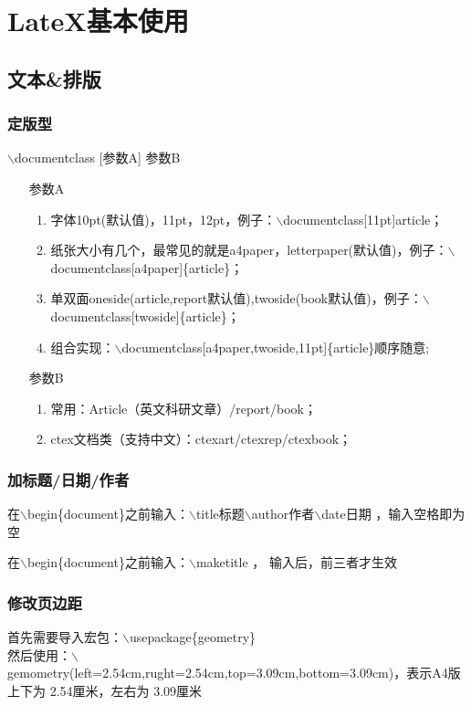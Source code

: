 \documentclass{article}
\begin{document}
\section{LateX基本使用}
\subsection{文本\&排版}
\subsubsection{定版型}
$\backslash$documentclass [参数A] {参数B}
\begin{itemize}
\item[参数A] 

\begin{enumerate}[1]
\item 字体10pt(默认值)，11pt，12pt，例子：$\backslash$documentclass[11pt]{article}；
\item 纸张大小有几个，最常见的就是a4paper，letterpaper(默认值)，例子：$\backslash$documentclass[a4paper]\{article\}；
\item 单双面oneside(article,report默认值),twoside(book默认值)，例子：$\backslash$documentclass[twoside]\{article\}；
\item 组合实现：$\backslash$documentclass[a4paper,twoside,11pt]\{article\}顺序随意;
\end{enumerate}

\item[参数B] 
\begin{enumerate}[1]
    \item 常用：Article（英文科研文章）/report/book；
    \item ctex文档类（支持中文）：ctexart/ctexrep/ctexbook；
\end{enumerate}

\end{itemize}

\subsubsection{加标题/日期/作者}

在$\backslash$begin\{document\}之前输入：$\backslash$title{标题}$\backslash$author{作者}$\backslash$date{日期} ，输入空格即为空

在$\backslash$begin\{document\}之前输入：$\backslash$maketitle ，  输入后，前三者才生效        


\subsubsection{修改页边距}
首先需要导入宏包：$\backslash$usepackage\{geometry\}\\
然后使用：$\backslash$gemometry(left=2.54cm,rught=2.54cm,top=3.09cm,bottom=3.09cm)，表示A4版上下为 2.54厘米，左右为 3.09厘米
\end{document}
